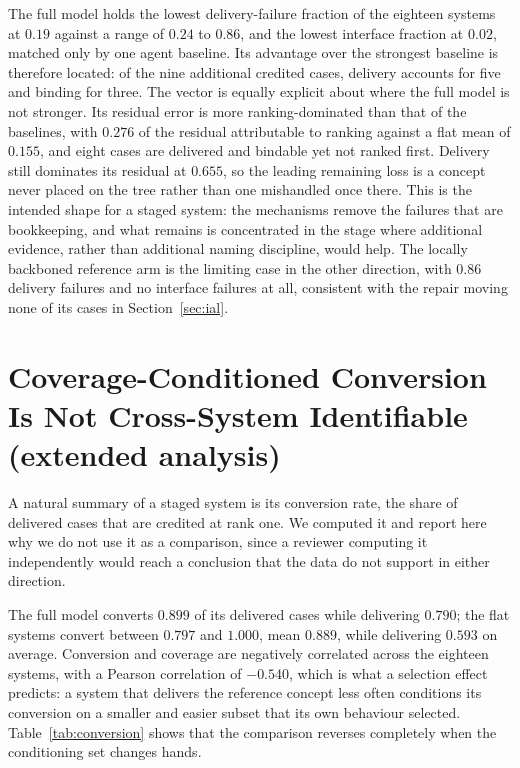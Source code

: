 \documentclass[letterpaper]{article}
\begin{document}
The full model holds the lowest delivery-failure fraction of the eighteen systems at $0.19$ against a range of $0.24$ to $0.86$, and the lowest interface fraction at $0.02$, matched only by one agent baseline.
Its advantage over the strongest baseline is therefore located: of the nine additional credited cases, delivery accounts for five and binding for three.
The vector is equally explicit about where the full model is not stronger.
Its residual error is more ranking-dominated than that of the baselines, with $0.276$ of the residual attributable to ranking against a flat mean of $0.155$, and eight cases are delivered and bindable yet not ranked first.
Delivery still dominates its residual at $0.655$, so the leading remaining loss is a concept never placed on the tree rather than one mishandled once there.
This is the intended shape for a staged system: the mechanisms remove the failures that are bookkeeping, and what remains is concentrated in the stage where additional evidence, rather than additional naming discipline, would help.
The locally backboned reference arm is the limiting case in the other direction, with $0.86$ delivery failures and no interface failures at all, consistent with the repair moving none of its cases in Section~\ref{sec:ial}.

\section{Coverage-Conditioned Conversion Is Not Cross-System Identifiable (extended analysis)}
\label{sec:conversion}

A natural summary of a staged system is its conversion rate, the share of delivered cases that are credited at rank one.
We computed it and report here why we do not use it as a comparison, since a reviewer computing it independently would reach a conclusion that the data do not support in either direction.

The full model converts $0.899$ of its delivered cases while delivering $0.790$; the flat systems convert between $0.797$ and $1.000$, mean $0.889$, while delivering $0.593$ on average.
Conversion and coverage are negatively correlated across the eighteen systems, with a Pearson correlation of $-0.540$, which is what a selection effect predicts: a system that delivers the reference concept less often conditions its conversion on a smaller and easier subset that its own behaviour selected.
Table~\ref{tab:conversion} shows that the comparison reverses completely when the conditioning set changes hands.
\end{document}
